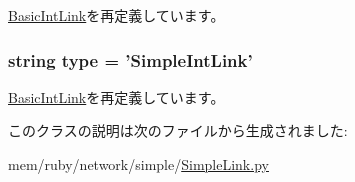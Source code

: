 \hyperlink{classBasicLink_1_1BasicIntLink_a17da7064bc5c518791f0c891eff05fda}{BasicIntLink}を再定義しています。\hypertarget{classSimpleLink_1_1SimpleIntLink_acce15679d830831b0bbe8ebc2a60b2ca}{
\subsubsection[{type}]{\setlength{\rightskip}{0pt plus 5cm}string {\bf type} = '{\bf SimpleIntLink}'}}
\label{classSimpleLink_1_1SimpleIntLink_acce15679d830831b0bbe8ebc2a60b2ca}


\hyperlink{classBasicLink_1_1BasicIntLink_acce15679d830831b0bbe8ebc2a60b2ca}{BasicIntLink}を再定義しています。

このクラスの説明は次のファイルから生成されました:\begin{DoxyCompactItemize}
\item 
mem/ruby/network/simple/\hyperlink{SimpleLink_8py}{SimpleLink.py}\end{DoxyCompactItemize}
